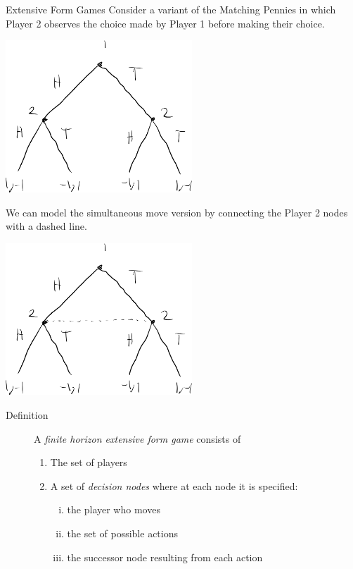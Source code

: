 \documentclass[10pt]{extarticle}
\begin{document}
  \begin{problem}{Extensive Form Games}
    Consider a variant of the Matching Pennies in which Player 2 observes the choice made by Player 1 before making their choice.
    \begin{center}
      \includegraphics[width=7cm]{images/matching_pennies_tree.png}
    \end{center}
    We can model the simultaneous move version by connecting the Player 2 nodes with a dashed line.
    \begin{center}
      \includegraphics[width=7cm]{images/matching_pennies_simultaneous.png}
    \end{center}
    \begin{description}
      \item[Definition] A \textit{finite horizon extensive form game} consists of
        \begin{enumerate}[(1)]
          \item The set of players
          \item A set of \textit{decision nodes} where at each node it is specified:
            \begin{enumerate}[(i)]
              \item the player who moves
              \item the set of possible actions
              \item the successor node resulting from each action

\end{enumerate}
\end{enumerate}
\end{description}
\end{problem}
\end{document}
